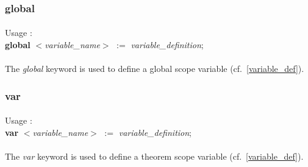 \subsubsection {global}

\label {global_kw}

\paragraph{}
Usage :\\
\textbf {global} \textit{$<$variable\_name$>$} $:=$ \textit{variable\_definition};

\paragraph{}
The \textit{global} keyword is used to define a global scope 
variable (cf.~\ref{variable_def}).

\subsubsection {var}

\label {global_kw}

\paragraph{}
Usage :\\
\textbf {var} \textit{$<$variable\_name$>$} $:=$ \textit{variable\_definition};

\paragraph{}
The \textit{var} keyword is used to define a theorem scope 
variable (cf.~\ref{variable_def}).
